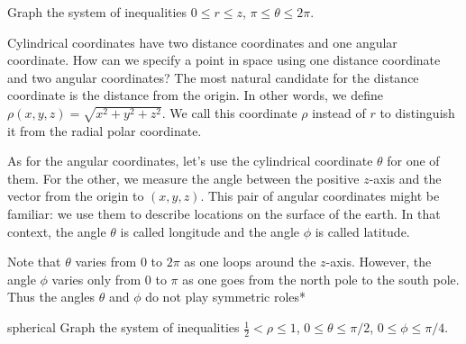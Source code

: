 \documentclass[svgnames]{watsonbook}
\begin{document}
\begin{exercise}{}{}
  Graph the system of inequalities $0 \leq r \leq z$, \: $\pi \leq \theta
  \leq 2\pi$. 
\end{exercise}

Cylindrical coordinates have two distance coordinates and one angular
coordinate. How can we specify a point in space using one distance
coordinate and two angular coordinates? The most natural candidate for
the distance coordinate is the distance from the origin. In other
words, we define $\rho(x,y,z) = \sqrt{x^2 + y^2 + z^2}$. We call this coordinate
$\rho$ instead of $r$ to distinguish it from the radial polar coordinate.

As for the angular coordinates, let's use the cylindrical coordinate
$\theta$ for one of them. For the other, we measure the angle between
the positive $z$-axis and the vector from the origin to
$(x,y,z)$. This pair of angular coordinates might be familiar: we use
them to describe locations on the surface of the earth. In that
context, the angle $\theta$ is called longitude and the angle $\phi$
is called latitude.

Note that $\theta$ varies from 0 to $2\pi$ as one loops around the
$z$-axis. However, the angle $\phi$ varies only from 0 to $\pi$ as one
goes from the north pole to the south pole. Thus the
angles $\theta$ and $\phi$ do not play symmetric roles*

\begin{example}{}{spherical}
  Graph the system of inequalities $\tfrac{1}{2} < \rho \leq 1$, \: $0
  \leq \theta \leq \pi/2$, \: $0 \leq \phi \leq \pi/4$. 
\end{example}
\end{document}
